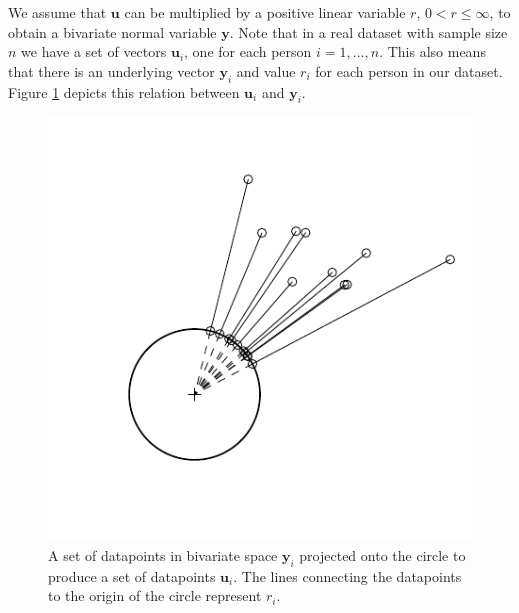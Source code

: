 \documentclass[11pt,]{article}
\begin{document}
We assume that \(\boldsymbol{u}\) can be multiplied by a positive linear
variable \(r\), \(0 < r \leq \infty\), to obtain a bivariate normal
variable \(\boldsymbol{y}\). Note that in a real dataset with sample
size \(n\) we have a set of vectors \(\boldsymbol{u}_{i}\), one for each
person \(i = 1, \dots, n\). This also means that there is an underlying
vector \(\boldsymbol{y}_{i}\) and value \(r_{i}\) for each person in our
dataset. Figure \ref{projectingplot} depicts this relation between
\(\boldsymbol{u}_{i}\) and \(\boldsymbol{y}_{i}\).

\begin{figure}
        \centering

\includegraphics[width=\textwidth]{plotprojecting.pdf}
       
        \caption{A set of datapoints in bivariate space $\boldsymbol{y}_i$ projected onto the circle to produce         a set of datapoints $\boldsymbol{u}_i$. The lines connecting the datapoints to the origin of the circle         represent $r_i$.}
        
        \label{projectingplot}
        
\end{figure}
\end{document}
